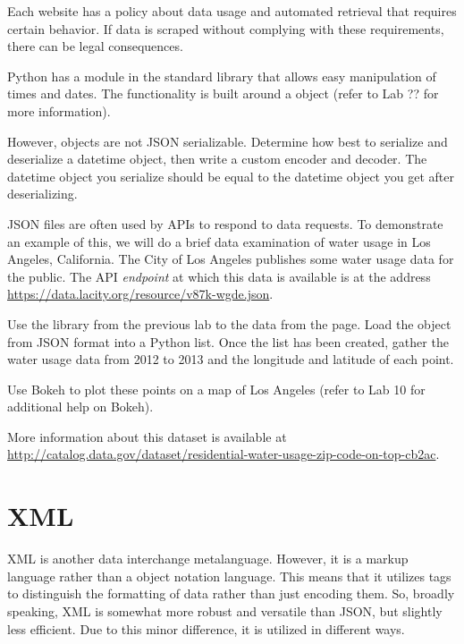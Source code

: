 \begin{warn}
Each website has a policy about data usage and automated retrieval that requires certain behavior.
If data is scraped without complying with these requirements, there can be legal consequences.
\end{warn}

\begin{problem} %
Python has a module in the standard library that allows easy manipulation of times and dates. The functionality is built around a  object (refer to Lab ?? for more information).

However,  objects are not JSON serializable.
Determine how best to serialize and deserialize a datetime object, then write a custom encoder and decoder.
The datetime object you serialize should be equal to the datetime object you get after deserializing.
\label{prob:datetime_json}
\end{problem}

\begin{problem}
JSON files are often used by APIs to respond to data requests.
To demonstrate an example of this, we will do a brief data examination of water usage in Los Angeles, California.
The City of Los Angeles publishes some water usage data for the public.
The API \emph{endpoint} at which this data is available is at the address \url{https://data.lacity.org/resource/v87k-wgde.json}.

Use the  library from the previous lab to  the data from the page. Load the object from JSON format into a Python list.
Once the list has been created, gather the water usage data from 2012 to 2013 and the longitude and latitude of each point.

Use Bokeh to plot these points on a map of Los Angeles (refer to Lab 10 for additional help on Bokeh).

More information about this dataset is available at \url{http://catalog.data.gov/dataset/residential-water-usage-zip-code-on-top-cb2ac}.
\end{problem}

\section*{XML} %

XML is another data interchange metalanguage.
However, it is a markup language rather than a object notation language. This means that it utilizes tags to distinguish the formatting of data rather than just encoding them.
So, broadly speaking, XML is somewhat more robust and versatile than JSON, but slightly less efficient.
Due to this minor difference, it is utilized in different ways.

